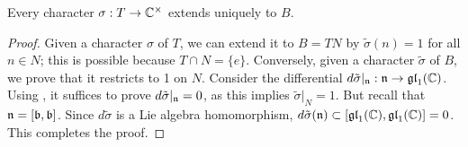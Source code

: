 \begin{lemma}
\label{charext}
Every character $\sigma : T \to \mathbb{C}^{\times}$ extends uniquely to $B$. 
\end{lemma}
\begin{proof}
Given a character $\sigma$ of $T$, we can extend it to $B = TN$ by $\tilde \sigma(n) = 1$ for all $n\in N$; this
is possible because $T\cap N = \{e\}$. Conversely, given a character $\tilde \sigma$ of $B$, we prove that
it restricts to 1 on $N$. Consider the differential $d\tilde \sigma|_{\mathfrak n} : \mathfrak n \to \mathfrak{gl}_1(\mathbb{C})$. Using , it suffices to prove $d\tilde \sigma|_{\mathfrak n} = 0$, as this implies $\tilde \sigma|_N = 1$.
But recall that $\mathfrak n = [\mathfrak b, \mathfrak b]$. Since $d\tilde \sigma$ is a Lie algebra homomorphism, $d \tilde \sigma (\mathfrak n)
\subset [\mathfrak{gl}_1(\mathbb{C}), \mathfrak{gl}_1(\mathbb{C})] = 0$. This completes the proof.
\end{proof}

